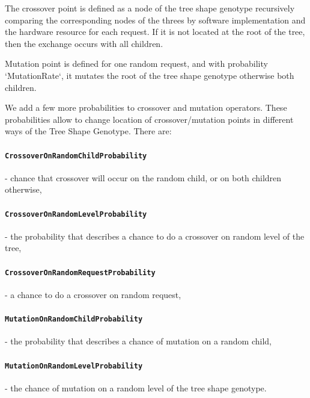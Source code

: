The crossover point is defined as a node of the tree shape genotype recursively comparing the corresponding nodes of the threes by software implementation and the hardware resource for each request.
If it is not located at the root of the tree, then the exchange occurs with all children.

Mutation point is defined for one random request, and with probability `MutationRate`, it mutates the root of the tree shape genotype otherwise both children.

We add a few more probabilities to crossover and mutation operators. These probabilities allow to change location of crossover/mutation points in different ways of the Tree Shape Genotype.
There are:
	\paragraph{\texttt{CrossoverOnRandomChildProbability}} - chance that crossover will occur on the random child, or on both children otherwise,
	\paragraph{\texttt{CrossoverOnRandomLevelProbability}} - the probability that describes a chance to do a crossover on random level of the tree, 
	\paragraph{\texttt{CrossoverOnRandomRequestProbability}} - a chance to do a crossover on random request,
	\paragraph{\texttt{MutationOnRandomChildProbability}} - the probability that describes a chance of mutation on a random child,
	\paragraph{\texttt{MutationOnRandomLevelProbability}} - the chance of mutation on a random level of the tree shape genotype.


